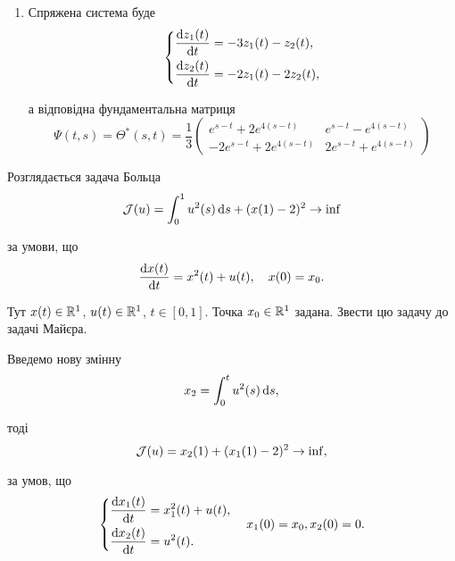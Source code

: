 \begin{solution}
\begin{enumerate}
		\item Спряжена система буде \[
		\left\{
			\begin{aligned}
				\frac{\mathop{}\!\mathrm{d} z_1 (t)}{\mathop{}\!\mathrm{d} t} &= - 3 z_1 (t) - z_2 (t), \\
				\frac{\mathop{}\!\mathrm{d} z_2 (t)}{\mathop{}\!\mathrm{d} t} &= - 2 z_1 (t) - 2 z_2 (t),
			\end{aligned}
		\right.
		\]

		а відповідна фундаментальна матриця \[ \Psi(t, s) = \Theta^*(s, t) = \frac{1}{3}
			\begin{pmatrix}
				e^{s - t} + 2 e^{4 (s - t)} & e^{s - t} - e^{4 (s - t)} \\
				-2 e^{s - t} + 2 e^{4 (s - t)} & 2 e^{s - t} + e^{4 (s - t)}
			\end{pmatrix}
		\]
	\end{enumerate}
\end{solution}

\begin{problem}
	Розглядається задача Больца \[ \mathcal{J} (u) = \int_0^1 u^2 (s) \mathop{}\!\mathrm{d} s + ( x (1) - 2 )^2 \to \inf \]

	за умови, що \[ \frac{\mathop{}\!\mathrm{d} x (t)}{\mathop{}\!\mathrm{d} t} = x^2 (t) + u (t), \quad x (0) = x_0. \]

	Тут $x (t) \in \mathbb{R}^1$, $u (t) \in \mathbb{R}^1$, $t \in [0, 1]$. Точка $x_0 \in \mathbb{R}^1$ задана. Звести цю задачу до задачі Майєра.
\end{problem}

\begin{solution}
	Введемо нову змінну \[ x_2 = \int_0^t u^2 (s) \mathop{}\!\mathrm{d} s, \] 

	тоді \[ \mathcal{J} (u) = x_2 (1) + ( x_1 (1) - 2)^2 \to \inf, \]

	за умов, що \[ 
	\left\{
		\begin{aligned}
			\frac{\mathop{}\!\mathrm{d} x_1 (t)}{\mathop{}\!\mathrm{d} t} &= x_1^2 (t) + u (t), \\
			\frac{\mathop{}\!\mathrm{d} x_2 (t)}{\mathop{}\!\mathrm{d} t} &= u^2 (t).
		\end{aligned}
	\right.
	\quad
	x_1 (0) = x_0, x_2 (0) = 0.
	\]
\end{solution}

